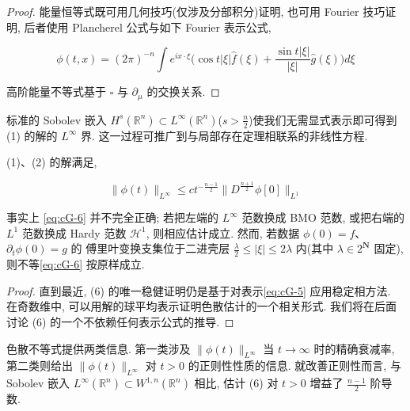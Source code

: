 \begin{proof}
能量恒等式既可用几何技巧(仅涉及分部积分)证明, 也可用 Fourier 技巧证明, 后者使用 Plancherel 公式与如下 Fourier 表示公式, 

\begin{equation}
\phi (t,  x) = (2 \pi) ^ {- n} \int e ^ {i x \cdot \xi} \Big(\cos t | \xi | \widehat{f} (\xi) + \frac {\sin t | \xi |}{| \xi |} \widehat{g} (\xi) \Big) d \xi\label{eq:cG-5}
\end{equation}

高阶能量不等式基于 $\square$ 与 $\partial_{\mu}$ 的交换关系. 
\end{proof}

\begin{remark}\label{rem:cG-1.2}
标准的 Sobolev 嵌入 $H^{s}(\mathbb{R}^{n}) \subset L^{\infty}(\mathbb{R}^{n})$($s > \frac{n}{2}$)使我们无需显式表示即可得到 (1) 的解的 $L^{\infty}$ 界. 这一过程可推广到与局部存在定理相联系的非线性方程. 
\end{remark}

\begin{proposition}[色散不等式]\label{prop:cG-1.3}
(1)、(2) 的解满足, 

\begin{equation}
\| \phi (t) \| _ {L ^ {\infty}} \leq c t ^ {- \frac {n - 1}{2}} \| D ^ {\frac {n + 1}{2}} \phi [ 0 ] \| _ {L ^ {1}}\label{eq:cG-6}
\end{equation}
\end{proposition}

\begin{remark}\label{rem:cG-1.4}
事实上 \eqref{eq:cG-6} 并不完全正确; 若把左端的 $L^{\infty}$ 范数换成 BMO 范数, 或把右端的 $L^1$ 范数换成 Hardy 范数 $\mathcal{H}^1$, 则相应估计成立. 然而, 若数据 $\phi(0) = f$、$\partial_t\phi(0) = g$ 的 傅里叶变换支集位于二进壳层 $\frac{\lambda}{2} \leq |\xi| \leq 2\lambda$ 内(其中 $\lambda \in 2^{\mathbf{N}}$ 固定), 则不等\eqref{eq:cG-6} 按原样成立. 
\end{remark}

\begin{proof}
直到最近, (6) 的唯一稳健证明仍是基于对表示\eqref{eq:cG-5} 应用稳定相方法. 在奇数维中, 可以用解的球平均表示证明色散估计的一个相关形式. 我们将在后面讨论 (6) 的一个不依赖任何表示公式的推导. 
\end{proof}

\begin{remark}\label{rem:cG-1.5}
色散不等式提供两类信息. 第一类涉及 $\|\phi(t)\|_{L^{\infty}}$ 当 $t\to\infty$ 时的精确衰减率, 第二类则给出 $\|\phi(t)\|_{L^{\infty}}$ 对 $t>0$ 的正则性性质的信息. 就改善正则性而言, 与 Sobolev 嵌入 $L^{\infty}(\mathbb{R}^{n})\subset W^{1, n}(\mathbb{R}^{n})$ 相比, 估计 (6) 对 $t>0$ 增益了 $\frac{n-1}{2}$ 阶导数. 
\end{remark}


